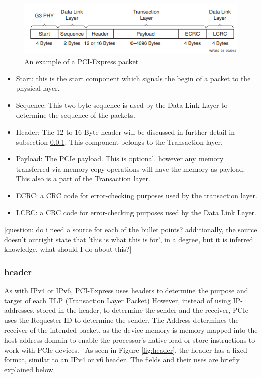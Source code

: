 \begin{figure}
\includegraphics[width = \linewidth]{figures/PCIE-packet}
\caption{An example of a PCI-Express packet ~\parencite{lawley_understanding_2014}}
\label{fig:packet}
\end{figure}

\begin{itemize}
\item Start: this is the start component which signals the begin of a packet to the physical layer.
\item Sequence: This two-byte sequence is used by the Data Link Layer to determine the sequence of the packets.
\item Header: The 12 to 16 Byte header will be discussed in further detail in subsection \ref{sec:header}. This component belongs to the Transaction layer. 
\item Payload: The PCIe payload. This is optional, however any memory transferred via memory copy operations will have the memory as payload. This also is a part of the Transaction layer.
\item ECRC: a CRC code for error-checking purposes used by the transaction layer.
\item LCRC: a CRC code for error-checking purposes used by the Data Link Layer.
\end{itemize}

[question: do i need a source for each of the bullet points? additionally, the source doesn't outright state that 'this is what this is for', in a degree, but it is inferred knowledge. what should I do about this?]

\subsubsection{header}
\label{sec:header}
As with IPv4 or IPv6, PCI-Express uses headers to determine the purpose and target of each TLP (Transaction Layer Packet)
However, instead of using IP-addresses, stored in the header, to determine the sender and the receiver, PCIe uses the Requester ID to determine the sender. The Address determines the receiver of the intended packet, as the device memory is memory-mapped into the host address domain to enable the processor's native load or store instructions to work with PCIe devices.~\parencite{oracle_inc_pci_nodate} As seen in Figure \ref{fig:header}, the header has a fixed format, similar to an IPv4 or v6 header. The fields and their uses are briefly explained below.

